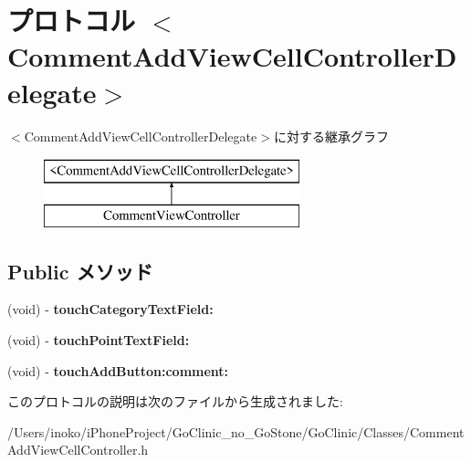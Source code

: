 \hypertarget{protocol_comment_add_view_cell_controller_delegate-p}{
\section{プロトコル $<$CommentAddViewCellControllerDelegate$>$}
\label{protocol_comment_add_view_cell_controller_delegate-p}
}
$<$CommentAddViewCellControllerDelegate$>$に対する継承グラフ\begin{figure}[H]
\begin{center}
\leavevmode
\includegraphics[height=2.000000cm]{protocol_comment_add_view_cell_controller_delegate-p}
\end{center}
\end{figure}
\subsection*{Public メソッド}
\begin{DoxyCompactItemize}
\item 
\hypertarget{protocol_comment_add_view_cell_controller_delegate-p_a99b92c3da0a67911729e9a41756d6209}{
(void) -\/ {\bfseries touchCategoryTextField:}}
\label{protocol_comment_add_view_cell_controller_delegate-p_a99b92c3da0a67911729e9a41756d6209}

\item 
\hypertarget{protocol_comment_add_view_cell_controller_delegate-p_ad611678a62d6024c3c189451295fc1d9}{
(void) -\/ {\bfseries touchPointTextField:}}
\label{protocol_comment_add_view_cell_controller_delegate-p_ad611678a62d6024c3c189451295fc1d9}

\item 
\hypertarget{protocol_comment_add_view_cell_controller_delegate-p_a5775deda3eb701abe8821b4425ae1f3c}{
(void) -\/ {\bfseries touchAddButton:comment:}}
\label{protocol_comment_add_view_cell_controller_delegate-p_a5775deda3eb701abe8821b4425ae1f3c}

\end{DoxyCompactItemize}


このプロトコルの説明は次のファイルから生成されました:\begin{DoxyCompactItemize}
\item 
/Users/inoko/iPhoneProject/GoClinic\_\-no\_\-GoStone/GoClinic/Classes/CommentAddViewCellController.h\end{DoxyCompactItemize}
